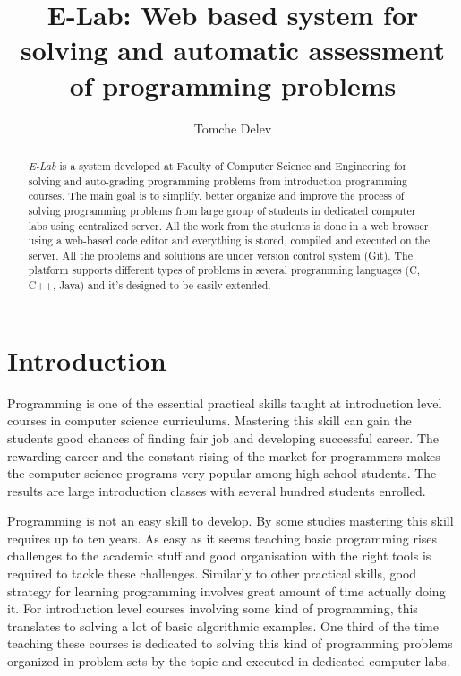 \documentclass{article}
\begin{document}
\title{E-Lab: Web based system for solving and automatic assessment of
programming problems}

\author{Tomche Delev}

\maketitle

\begin{abstract}

\emph{E-Lab} is a system developed at Faculty of Computer Science and
Engineering for solving and auto-grading programming problems from introduction
programming courses. The main goal is to simplify, better organize and
improve the process of solving programming problems from large group of
students in dedicated computer labs using centralized server. All the work from
the students is done in a web browser using a web-based code editor and
everything is stored, compiled and executed on the server. All the
problems and solutions are under version control system (Git). The platform
supports different types of problems in several programming languages (C, C++,
Java) and it's designed to be easily extended.
\end{abstract}

\section{Introduction}
Programming is one of the essential practical skills taught at introduction
level courses in computer science curriculums. Mastering this skill can gain the
students good chances of finding fair job and developing successful career. The
rewarding career and the constant rising of the market for programmers makes the
computer science programs very popular among high school students. The results
are large introduction classes with several hundred students enrolled. 

Programming is not an easy skill to develop. By some studies
\cite{winslow1996programming} mastering this skill requires up to ten years. As
easy as it seems teaching basic programming rises challenges to the academic
stuff and good organisation with the right tools is required to tackle these
challenges. Similarly to other practical skills, good strategy for learning
programming involves great amount of time actually doing it. For introduction
level courses involving some kind of programming, this translates to solving a
lot of basic algorithmic examples. One third of the time teaching these courses
is dedicated to solving this kind of programming problems organized in problem sets by the
topic and executed in dedicated computer labs.
\end{document}
